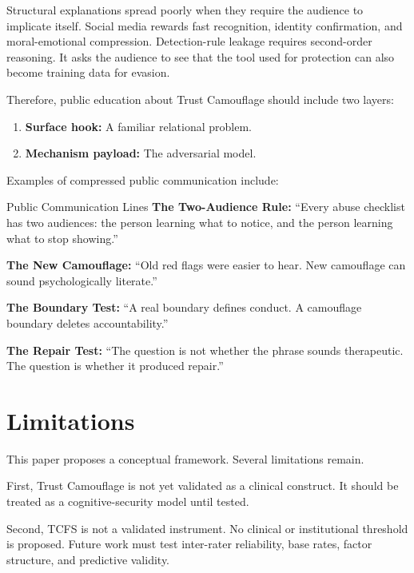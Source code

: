 \documentclass[11pt, letterpaper]{article}
\newcommand{\term}[1]{\textbf{#1}}
\begin{document}
Structural explanations spread poorly when they require the audience to implicate itself. Social media rewards fast recognition, identity confirmation, and moral-emotional compression. Detection-rule leakage requires second-order reasoning. It asks the audience to see that the tool used for protection can also become training data for evasion.

Therefore, public education about Trust Camouflage should include two layers:

\begin{enumerate}
    \item \term{Surface hook:} A familiar relational problem.
    \item \term{Mechanism payload:} The adversarial model.
\end{enumerate}

Examples of compressed public communication include:

\begin{frameworkbox}{Public Communication Lines}
\term{The Two-Audience Rule:} ``Every abuse checklist has two audiences: the person learning what to notice, and the person learning what to stop showing.''

\vspace{0.7em}
\term{The New Camouflage:} ``Old red flags were easier to hear. New camouflage can sound psychologically literate.''

\vspace{0.7em}
\term{The Boundary Test:} ``A real boundary defines conduct. A camouflage boundary deletes accountability.''

\vspace{0.7em}
\term{The Repair Test:} ``The question is not whether the phrase sounds therapeutic. The question is whether it produced repair.''
\end{frameworkbox}

\section{Limitations}

This paper proposes a conceptual framework. Several limitations remain.

First, Trust Camouflage is not yet validated as a clinical construct. It should be treated as a cognitive-security model until tested.

Second, TCFS is not a validated instrument. No clinical or institutional threshold is proposed. Future work must test inter-rater reliability, base rates, factor structure, and predictive validity.
\end{document}
